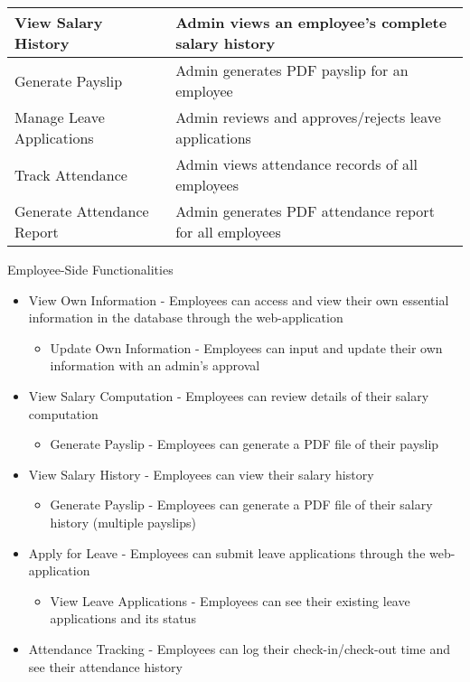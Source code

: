 \documentclass[journal]{./IEEE/IEEEtran}
\begin{document}
\begin{itemize}
\begin{table}[H]
\begin{tabular}{|p{}|p{}|}
\hline
View Salary History & Admin views an employee's complete salary history \\
\hline
Generate Payslip & Admin generates PDF payslip for an employee \\
\hline
Manage Leave Applications & Admin reviews and approves/rejects leave applications \\
\hline
Track Attendance & Admin views attendance records of all employees \\
\hline
Generate Attendance Report & Admin generates PDF attendance report for all employees \\
\hline
\end{tabular}
\end{table}
    
\end{itemize}
Employee-Side Functionalities
\begin{itemize}
    \item View Own Information - Employees can access and view their own essential information in the database through the web-application
    \begin{itemize}
        \item Update Own Information - Employees can input and update their own information with an admin’s approval
    \end{itemize}
    \item View Salary Computation - Employees can review details of their salary computation
    \begin{itemize}
        \item Generate Payslip - Employees can generate a PDF file of their payslip
    \end{itemize}
    \item View Salary History - Employees can view their salary history
    \begin{itemize}
        \item Generate Payslip - Employees can generate a PDF file of their salary history (multiple payslips)
    \end{itemize}
    \item Apply for Leave - Employees can submit leave applications through the web-application
    \begin{itemize}
        \item View Leave Applications - Employees can see their existing leave applications and its status 
    \end{itemize}
    \item Attendance Tracking - Employees can log their check-in/check-out time and see their attendance history
\end{itemize}
\end{document}
